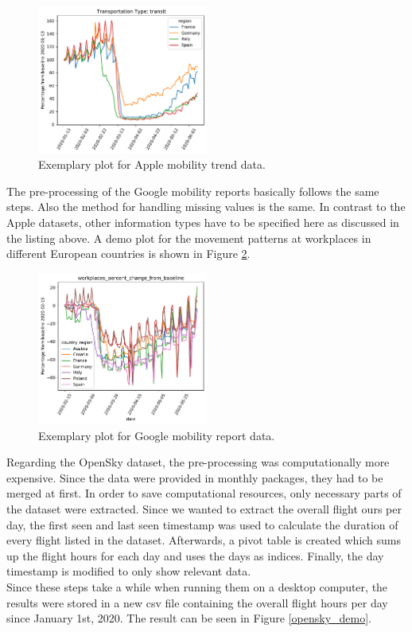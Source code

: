 \begin{figure}[h]
\centering
\includegraphics[width=0.5\textwidth]{mobility/apple_demo.pdf}
\caption{Exemplary plot for Apple mobility trend data.}
\label{apple_demo}
\end{figure}

The pre-processing of the Google mobility reports basically follows the same steps. Also the method for handling missing values is the same. In contrast to the Apple datasets, other information types have to be specified here as discussed in the listing above. A demo plot for the movement patterns at workplaces in different European countries is shown in Figure \ref{google_demo}.

\begin{figure}[h]
\centering
\includegraphics[width=0.5\textwidth]{mobility/google_demo.pdf}
\caption{Exemplary plot for Google mobility report data.}
\label{google_demo}
\end{figure}

Regarding the OpenSky dataset, the pre-processing was computationally more expensive. Since the data were provided in monthly packages, they had to be merged at first. In order to save computational resources, only necessary parts of the dataset were extracted. Since we wanted to extract the overall flight ours per day, the first seen and last seen timestamp was used to calculate the duration of every flight listed in the dataset. Afterwards, a pivot table is created which sums up the flight hours for each day and uses the days as indices. Finally, the day timestamp is modified to only show relevant data. \\
Since these steps take a while when running them on a desktop computer, 
the results were stored in a new csv file containing the overall flight hours per day since January 1st, 2020. The result can be seen in Figure \ref{opensky_demo}.

